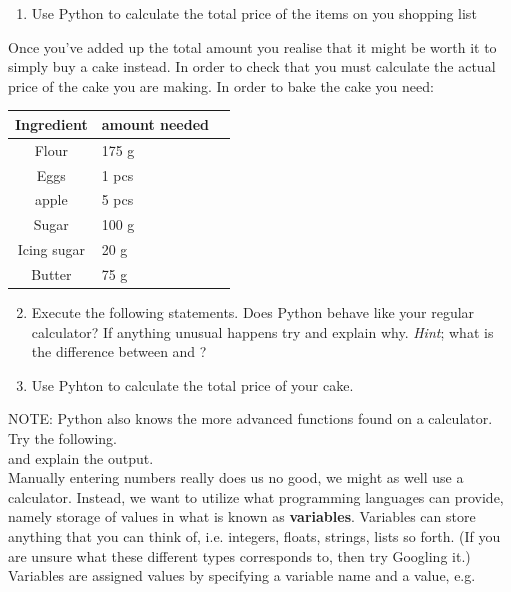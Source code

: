 \documentclass{article}
\begin{document}
\fi

\begin{enumerate}
    \item Use Python  to calculate the total price of the items on you shopping list  

\end{enumerate}

Once you've added up the total amount you realise that it might be worth it to simply buy a cake instead. In order to check that you must calculate the actual price of the cake you are making. In order to bake the cake you need:

\begin{center}
\begin{tabular}{c l l}
\hline
Ingredient & amount needed\\
\hline
Flour & 175 g \\
Eggs & 1 pcs \\
apple & 5 pcs \\
Sugar & 100 g \\
Icing sugar &  20 g \\
Butter & 75 g \\
\end{tabular}
\end{center}

\begin{enumerate}
  \setcounter{enumi}{1}
  \item Execute the following statements. Does Python behave like your regular calculator? If anything unusual happens try and explain why. {\em Hint}; what is the difference between {} and {}? 
 \item Use Pyhton to calculate the total price of your cake. \\
 
\end{enumerate}

NOTE: Python also knows the more advanced functions found on a calculator. Try the following. \\
 and explain the output.\\

Manually entering numbers really does us no good, we might as well use a
calculator. Instead, we want to utilize what programming languages can provide,
namely storage of values in what is known as {\bf variables}. Variables can store
anything that you can think of, i.e. integers, floats, strings, lists so
forth. (If you are unsure what these different types corresponds to, then try Googling it.) Variables are assigned values by specifying a variable name and a value, e.g.
\end{document}
